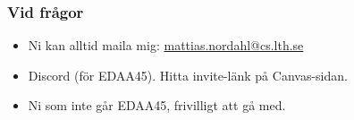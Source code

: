 \begin{frame}[fragile=singleslide]
	\frametitle{Vid frågor}

	\begin{itemize}
		\item Ni kan alltid maila mig: \url{mattias.nordahl@cs.lth.se}
		\item Discord (för EDAA45). Hitta invite-länk på Canvas-sidan.
		\item Ni som inte går EDAA45, frivilligt att gå med.
	\end{itemize}
\end{frame}